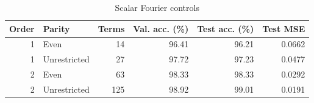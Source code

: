 \begin{table}[htbp]
\centering
\caption{Scalar Fourier controls}
\label{tab:scalar_fourier}
\small
\begin{tabular}{rlrrrr}
\toprule
Order & Parity & Terms & Val. acc. (\%) & Test acc. (\%) & Test MSE \\
\midrule
1 & Even & 14 & 96.41 & 96.21 & 0.0662 \\
1 & Unrestricted & 27 & 97.72 & 97.23 & 0.0477 \\
2 & Even & 63 & 98.33 & 98.33 & 0.0292 \\
2 & Unrestricted & 125 & 98.92 & 99.01 & 0.0191 \\
\bottomrule
\end{tabular}
\end{table}
